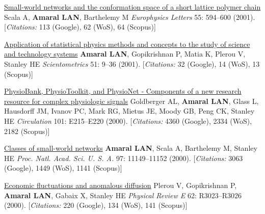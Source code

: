 \NumberedItem{\makebox[0.8cm][r]{[35]}}
\href{/people/amaral/small-world-networks-and-the-conformation-space-of-a-short-lattice-polymer-chain}
{Small-world networks and the conformation space of a short lattice polymer chain}
\newline
Scala A, {\textbf{Amaral LAN}}, Barthelemy M
\newline
\textit{Europhysics Letters}
    55:
594--600 (2001).
    [{\em{Citations:}} 113 (Google), 62 (WoS), 64 (Scopus)]
\newline
\Gap
~
\Gap

\NumberedItem{\makebox[0.8cm][r]{[34]}}
\href{/people/amaral/application-of-statistical-physics-methods-and-concepts-to-the-study-of-science-technology-systems}
{Application of statistical physics methods and concepts to the study of science and technology systems}
\newline
{\textbf{Amaral LAN}}, Gopikrishnan P, Matia K, Plerou V, Stanley HE
\newline
\textit{Scientometrics}
    51:
9--36 (2001).
    [{\em{Citations:}} 32 (Google), 14 (WoS), 13 (Scopus)]
\newline
\Gap
~
\Gap

\NumberedItem{\makebox[0.8cm][r]{[33]}}
\href{/people/amaral/physiobank-physiotoolkit-and-physionet-components-of-a-new-research-resource-for-complex-physiologic-signals}
{PhysioBank, PhysioToolkit, and PhysioNet - Components of a new research resource for complex physiologic signals}
\newline
Goldberger AL, {\textbf{Amaral LAN}}, Glass L, Hausdorff JM, Ivanov PC, Mark RG, Mietus JE, Moody GB, Peng CK, Stanley HE
\newline
\textit{Circulation}
    101:
E215--E220 (2000).
    [{\em{Citations:}} 4360 (Google), 2334 (WoS), 2182 (Scopus)]
\newline
\Gap
~
\Gap

\NumberedItem{\makebox[0.8cm][r]{[32]}}
\href{/people/amaral/classes-of-small-world-networks}
{Classes of small-world networks}
\newline
{\textbf{Amaral LAN}}, Scala A, Barthelemy M, Stanley HE
\newline
\textit{Proc. Natl. Acad. Sci. U. S. A.}
    97:
11149--11152 (2000).
    [{\em{Citations:}} 3063 (Google), 1449 (WoS), 1141 (Scopus)]
\newline
\Gap
~
\Gap

\NumberedItem{\makebox[0.8cm][r]{[31]}}
\href{/people/amaral/economic-fluctuations-and-anomalous-diffusion}
{Economic fluctuations and anomalous diffusion}
\newline
Plerou V, Gopikrishnan P, {\textbf{Amaral LAN}}, Gabaix X, Stanley HE
\newline
\textit{Physical Review E}
    62:
R3023--R3026 (2000).
    [{\em{Citations:}} 220 (Google), 134 (WoS), 141 (Scopus)]
\newline
\Gap
~
\Gap

